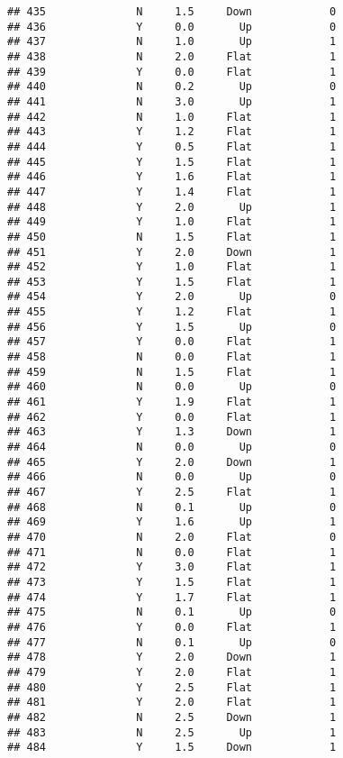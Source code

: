\documentclass[
]{article}
\begin{document}
\begin{verbatim}
## 435              N     1.5     Down            0
## 436              Y     0.0       Up            0
## 437              N     1.0       Up            1
## 438              N     2.0     Flat            1
## 439              Y     0.0     Flat            1
## 440              N     0.2       Up            0
## 441              N     3.0       Up            1
## 442              N     1.0     Flat            1
## 443              Y     1.2     Flat            1
## 444              Y     0.5     Flat            1
## 445              Y     1.5     Flat            1
## 446              Y     1.6     Flat            1
## 447              Y     1.4     Flat            1
## 448              Y     2.0       Up            1
## 449              Y     1.0     Flat            1
## 450              N     1.5     Flat            1
## 451              Y     2.0     Down            1
## 452              Y     1.0     Flat            1
## 453              Y     1.5     Flat            1
## 454              Y     2.0       Up            0
## 455              Y     1.2     Flat            1
## 456              Y     1.5       Up            0
## 457              Y     0.0     Flat            1
## 458              N     0.0     Flat            1
## 459              N     1.5     Flat            1
## 460              N     0.0       Up            0
## 461              Y     1.9     Flat            1
## 462              Y     0.0     Flat            1
## 463              Y     1.3     Down            1
## 464              N     0.0       Up            0
## 465              Y     2.0     Down            1
## 466              N     0.0       Up            0
## 467              Y     2.5     Flat            1
## 468              N     0.1       Up            0
## 469              Y     1.6       Up            1
## 470              N     2.0     Flat            0
## 471              N     0.0     Flat            1
## 472              Y     3.0     Flat            1
## 473              Y     1.5     Flat            1
## 474              Y     1.7     Flat            1
## 475              N     0.1       Up            0
## 476              Y     0.0     Flat            1
## 477              N     0.1       Up            0
## 478              Y     2.0     Down            1
## 479              Y     2.0     Flat            1
## 480              Y     2.5     Flat            1
## 481              Y     2.0     Flat            1
## 482              N     2.5     Down            1
## 483              N     2.5       Up            1
## 484              Y     1.5     Down            1

\end{verbatim}
\end{document}
